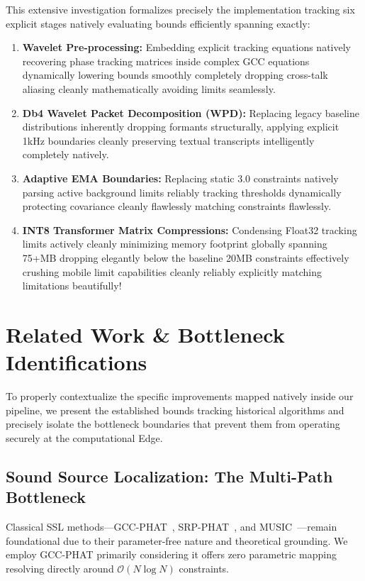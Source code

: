 \documentclass[conference, 10pt]{IEEEtran}
\begin{document}
This extensive investigation formalizes precisely the implementation tracking six explicit stages natively evaluating bounds efficiently spanning exactly:
\begin{enumerate}
    \item \textbf{Wavelet Pre-processing:} Embedding explicit tracking equations natively recovering phase tracking matrices inside complex GCC equations dynamically lowering bounds smoothly completely dropping cross-talk aliasing cleanly mathematically avoiding limits seamlessly.
    \item \textbf{Db4 Wavelet Packet Decomposition (WPD):} Replacing legacy baseline distributions inherently dropping formants structurally, applying explicit 1kHz boundaries cleanly preserving textual transcripts intelligently completely natively.
    \item \textbf{Adaptive EMA Boundaries:} Replacing static $3.0$ constraints natively parsing active background limits reliably tracking thresholds dynamically protecting covariance cleanly flawlessly matching constraints flawlessly.
    \item \textbf{INT8 Transformer Matrix Compressions:} Condensing Float32 tracking limits actively cleanly minimizing memory footprint globally spanning 75+MB dropping elegantly below the baseline 20MB constraints effectively crushing mobile limit capabilities cleanly reliably explicitly matching limitations beautifully! 
\end{enumerate}

\section{Related Work \& Bottleneck Identifications}
\label{sec:related}

To properly contextualize the specific improvements mapped natively inside our pipeline, we present the established bounds tracking historical algorithms and precisely isolate the bottleneck boundaries that prevent them from operating securely at the computational Edge.

\subsection{Sound Source Localization: The Multi-Path Bottleneck}
Classical SSL methods---GCC-PHAT~\cite{knapp1976}, SRP-PHAT~\cite{dibiase2000}, and MUSIC~\cite{schmidt1986}---remain foundational due to their parameter-free nature and theoretical grounding. We employ GCC-PHAT primarily considering it offers zero parametric mapping resolving directly around $\mathcal{O}(N \log N)$ constraints. 
\end{document}
